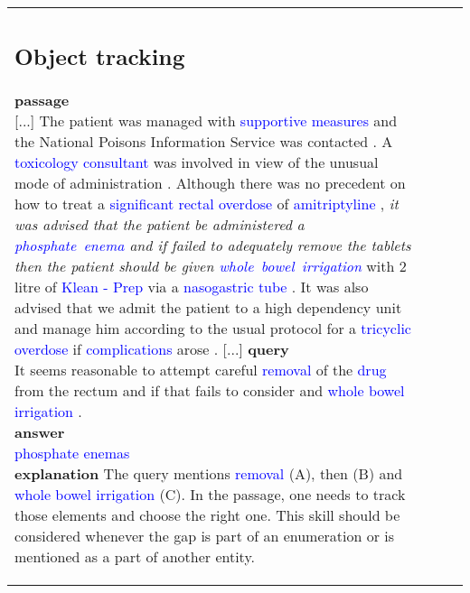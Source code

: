 \documentclass[11pt,a4paper]{article}
\begin{document}
\begin{table}[t]
\begin{tabular}{p{2.7cm} p{1.8cm} l r}
{\subsection{Object tracking}
\noindent
\textbf{passage}\newline
[...] The patient was managed with \textcolor{blue}{supportive measures} and the National Poisons Information Service was contacted . 
A \textcolor{blue}{toxicology consultant} was involved in view of the unusual mode of administration . 
Although there was no precedent on how to treat a \textcolor{blue}{significant rectal overdose} of \textcolor{blue}{amitriptyline} , \textit{it was advised that the patient be administered a \mbox{\textcolor{blue}{phosphate enema}} and if failed to adequately remove the tablets then the patient should be given \mbox{\textcolor{blue}{whole bowel irrigation}}} with 2 litre of \textcolor{blue}{Klean - Prep} via a \textcolor{blue}{nasogastric tube} . It was also advised that we admit the patient to a high dependency unit and manage him according to the usual protocol for a \textcolor{blue}{tricyclic overdose} if \textcolor{blue}{complications} arose . [...]
\textbf{query}\\
It seems reasonable to attempt careful \textcolor{blue}{removal} of the \textcolor{blue}{drug} from the rectum and if that fails to consider \textcolor{blue}{\textbf{\underline{\hspace{2cm}}}} and \textcolor{blue}{whole bowel irrigation} .\\
\textbf{answer}\\
\textcolor{blue}{phosphate enemas}\\
\textbf{explanation} The query mentions \textcolor{blue}{removal} (A), then \textcolor{blue}{\textbf{\underline{\hspace{2cm}}}} (B) and \textcolor{blue}{whole bowel irrigation} (C). In the passage, one needs to track those elements and choose the right one. This skill should be considered whenever the gap is part of an enumeration or is mentioned as a part of another entity.

}
\end{tabular}
\end{table}
\end{document}
